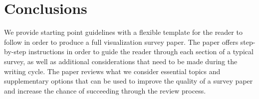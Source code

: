 \section{Conclusions}
We provide starting point guidelines with a flexible template for the reader to follow in order to produce a full visualization survey paper. The paper offers step-by-step instructions in order to guide the reader through each section of a typical survey, as well as additional considerations that need to be made during the writing cycle. The paper reviews what we consider essential topics and supplementary options that can be used to improve the quality of a survey paper and increase the chance of succeeding through the review process.